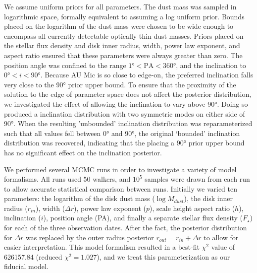 \documentclass[modern]{aastex62}
\begin{document}
We assume uniform priors for all parameters.
The dust mass was sampled in logarithmic space, formally equivalent to assuming a log uniform prior.
Bounds placed on the logarithm of the dust mass were chosen to be wide enough to encompass all currently detectable optically thin dust masses.
Priors placed on the stellar flux density and disk inner radius, width, power law exponent, and aspect ratio ensured that these parameters were always greater than zero.
The position angle was confined to the range $\ang[angle-symbol-over-decimal]{1} < \text{PA} < \ang[angle-symbol-over-decimal]{360}$, and the inclination to $\ang[angle-symbol-over-decimal]{0} < i < \ang[angle-symbol-over-decimal]{90}$.
Because AU Mic is so close to edge-on, the preferred inclination falls very close to the \ang[angle-symbol-over-decimal]{90} prior upper bound. 
To ensure that the proximity of the solution to the edge of parameter space does not affect the posterior distribution, we investigated the effect of allowing the inclination to vary above \ang[angle-symbol-over-decimal]{90}. 
Doing so produced a inclination distribution with two symmetric modes on either side of \ang[angle-symbol-over-decimal]{90}. 
When the resulting ’unbounded’ inclination distribution was reparameterized such that all values fell between \ang[angle-symbol-over-decimal]{0} and \ang[angle-symbol-over-decimal]{90}, the original ‘bounded’ inclination distribution was recovered, indicating that the placing a \ang[angle-symbol-over-decimal]{90} prior upper bound has no significant effect on the inclination posterior.

We performed several MCMC runs in order to investigate a variety of model formalisms. 
All runs used 50 walkers, and $10^5$ samples were drawn from each run to allow accurate statistical comparison between runs.
Initially we varied ten parameters: the logarithm of the disk dust mass ($\log M_{dust}$), the disk inner radius ($r_{in}$), width ($\Delta r$), power law exponent ($p$), scale height aspect ratio ($h$), inclination ($i$), position angle (PA), and finally a separate stellar flux density ($F_\star$) for each of the three observation dates. 
After the fact, the posterior distribution for $\Delta r$ was replaced by the outer radius posterior $r_{out} = r_{in} + \Delta r$ to allow for easier interpretation.
This model formalism resulted in a best-fit $\chi^2$ value of 626157.84 (reduced $\chi^2=1.027$), and we treat this parameterization as our fiducial model.
\end{document}
